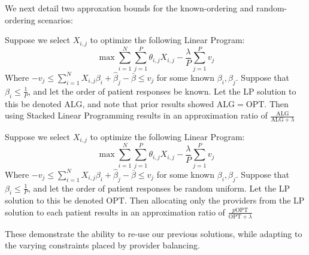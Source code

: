 We next detail two approxation bounds for the known-ordering and random-ordering scenarios: 
\begin{lemma}
Suppose we select $X_{i,j}$ to optimize the following Linear Program: 
\begin{equation}
    \max \sum_{i=1}^{N} \sum_{j=1}^{P} \theta_{i,j} X_{i,j} - \frac{\lambda}{P} \sum_{j=1}^{P} v_{j}
\end{equation}
Where $-v_{j} \leq \sum_{i=1}^{N} X_{i,j} \beta_{i} + \hat{\beta}_{j} - \bar{\beta}\leq v_{j}$ for some known $\beta_{i}, \hat{\beta}_{j}$. 
Suppose that $\beta_{i} \leq \frac{1}{P}$, and let the order of patient responses be known.  
Let the LP solution to this be denoted $\mathrm{ALG}$, and note that prior results showed $\mathrm{ALG} = \mathrm{OPT}$. 
Then using Stacked Linear Programming results in an approximation ratio of $\frac{\mathrm{ALG}}{\mathrm{ALG} + \lambda}$
\end{lemma}

\begin{lemma}
Suppose we select $X_{i,j}$ to optimize the following Linear Program: 
\begin{equation}
    \max \sum_{i=1}^{N} \sum_{j=1}^{P} \theta_{i,j} X_{i,j} - \frac{\lambda}{P} \sum_{j=1}^{P} v_{j}
\end{equation}
Where $-v_{j} \leq \sum_{i=1}^{N} X_{i,j} \beta_{i} + \hat{\beta}_{j} - \bar{\beta}\leq v_{j}$ for some known $\beta_{i}, \hat{\beta}_{j}$. 
Suppose that $\beta_{i} \leq \frac{1}{P}$, and let the order of patient responses be random uniform.  
Let the LP solution to this be denoted $\mathrm{OPT}$. 
Then allocating only the providers from the LP solution to each patient results in an approximation ratio of $\frac{p \mathrm{OPT}}{\mathrm{OPT} + \lambda}$
\end{lemma}
These demonstrate the ability to re-use our previous solutions, while adapting to the varying constraints placed by provider balancing. 
